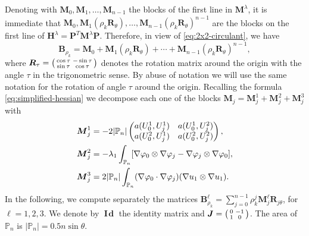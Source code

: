 \documentclass[JEP,XML,SOM,Unicode,ThmDefs,NoFloatCountersInSection,published]{cedram}
\newenvironment{smallpmatrix}{\big(\begin{smallmatrix}}{\end{smallmatrix}\big)}
\newcommand{\colsep}{\arraycolsep4.5pt}
\theoremstyle{plain}
\theoremstyle{definition}
\newcommand{\bo}[1]{{\boldsymbol#1}}
\newcommand{\Id}{\operatorname{{\bo I\!\bo d}}}
\def\Pp{{\mathbb{P}_n}}
\begin{document}
Denoting with $\bo M_0, \bo M_1,\dots, \bo M_{n-1}$ the blocks of the first line in $\bo M^\lambda$, it is immediate that $\bo M_0, \bo M_1(\rho_k \bo R_\theta),\dots, \bo M_{n-1}(\rho_k \bo R_\theta)^{n-1} $ are the blocks on the first line of $\bo H^\lambda = \bo P^T\bo M^\lambda \bo P$. Therefore, in view of \eqref{eq:2x2-circulant}, we have
\[
\bo B_{\rho_k} = \bo M_0+\bo M_1 (\rho_k \bo R_\theta)+\cdots+\bo M_{n-1} (\rho_k \bo R_\theta)^{n-1},
\]
where $\bo R_\tau=\begin{smallpmatrix}
\cos \tau & -\sin \tau \\
\sin \tau & \cos \tau
\end{smallpmatrix}$ denotes the rotation matrix around the origin with the angle $\tau$ in the trigonometric sense. By abuse of notation we will use the same notation for the rotation of angle $\tau$ around the origin. Recalling the formula \eqref{eq:simplified-hessian} we decompose each one of the blocks $\bo M_j = \bo M_j^1+\bo M_j^2+\bo M_j^3$ with
\begin{align*}
\colsep
\bo M_j^1 &= -2|\Pp| \begin{pmatrix}
a(U_0^1,U_j^1) & a(U_0^1,U_j^2) \\
a(U_0^2,U_j^1) & a(U_0^2,U_j^2)
\end{pmatrix},\\
\bo M_j^2 &= -\lambda_1 \int_{\Pp} [\nabla \varphi_0 \otimes \nabla \varphi_j - \nabla \varphi_j \otimes \nabla \varphi_0],
\\
\bo M_j^3 &= 2|\Pp| \int_\Pp (\nabla \varphi_0 \cdot \nabla \varphi_j) (\nabla u_1 \otimes \nabla u_1).
\end{align*}
In the following, we compute separately the matrices $\bo B_{\rho_k}^\ell = \sum_{j=0}^{n-1} \rho_k^j\bo M_j^\ell\bo R_{j\theta}$, for $\ell=1,2,3$. We denote by $\Id$ the identity matrix and $\bo J = \begin{smallpmatrix}0 & -1 \\ 1 & 0
\end{smallpmatrix}$. The area of $\Pp$ is $|\Pp|=0.5n\sin \theta$.
\end{document}
